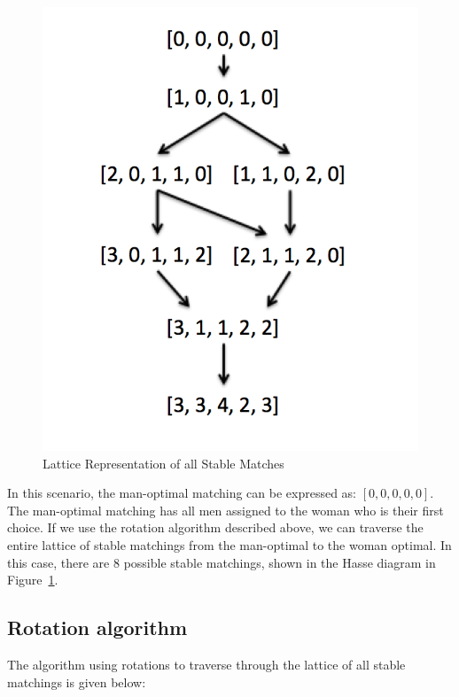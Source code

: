 \documentclass[a4paper]{article}
\begin{document}
\begin{figure}
\centering
\vspace{-20pt}
\includegraphics[scale=0.55]{stable_matching_poset.png}
\vspace{-10pt}
\caption{Lattice Representation of all Stable Matches}
\label{fig:lattice}
\vspace{-10pt}
\end{figure}

In this scenario, the man-optimal matching can be expressed as: $[0,0,0,0,0]$. 
The man-optimal matching has all men assigned to the woman who is their first choice.
If we use the rotation algorithm described above, we can traverse the entire lattice of stable matchings from the man-optimal to the woman optimal.
In this case, there are 8 possible stable matchings, shown in the Hasse diagram in Figure~\ref{fig:lattice}.

\subsection{Rotation algorithm}
The algorithm using rotations to traverse through the lattice of all stable matchings is given below:
\end{document}
